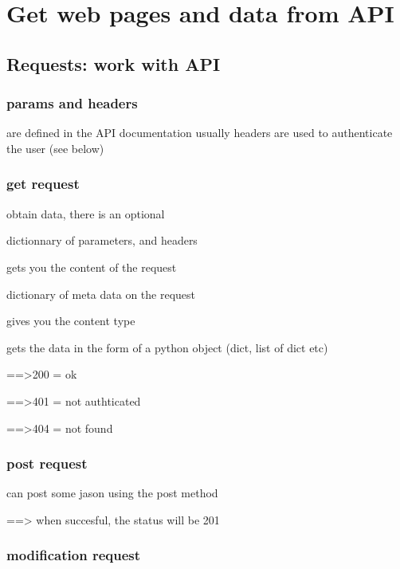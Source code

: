 

\section{Get web pages and data from API}

	\subsection{Requests: work with API}

		\subsubsection{params and headers}
			are defined in the API documentation
			usually headers are used to authenticate the user (see below)

		\subsubsection{get request}

			 obtain data, there is an optional 

			dictionnary of parameters, and headers

			 gets you the content of the request

			 dictionary of meta data on the request

			 gives you the content type

			 gets the data in the form of a python object (dict, list of dict etc)

			==>200 = ok

			==>401 = not authticated

			==>404 = not found

		\subsubsection{post request}

			can post some jason using the post method

			 ==> when succesful, the status will be 201

		\subsubsection{modification request}


